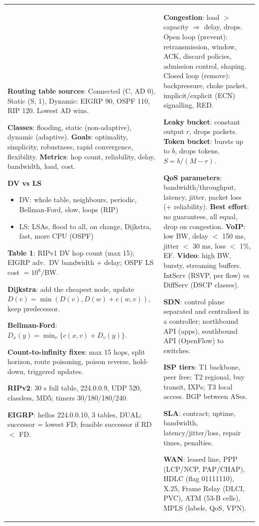 \documentclass[10pt]{article}
\begin{document}
\newpage
\begin{cheatsheet}
\small
\begin{tabularx}{\linewidth}{@{}XX@{}}
\textbf{Routing table sources}: Connected (C, AD 0), Static (S, 1), Dynamic: EIGRP 90, OSPF 110, RIP 120. Lowest AD wins.

\textbf{Classes}: flooding, static (non-adaptive), dynamic (adaptive).
\textbf{Goals}: optimality, simplicity, robustness, rapid convergence, flexibility.
\textbf{Metrics}: hop count, reliability, delay, bandwidth, load, cost.

\textbf{DV vs LS}
\begin{itemize}
\item DV: whole table, neighbours, periodic, Bellman-Ford, slow, loops (RIP)
\item LS: LSAs, flood to all, on change, Dijkstra, fast, more CPU (OSPF)
\end{itemize}
\textbf{Table 1}: RIPv1 DV hop count (max 15); EIGRP adv.\ DV bandwidth + delay; OSPF LS cost $=10^8/$BW.

\textbf{Dijkstra}: add the cheapest node, update $D(v)=\min(D(v), D(w)+c(w,v))$, keep predecessor.

\textbf{Bellman-Ford}: $D_x(y)=\min_v\{c(x,v)+D_v(y)\}$.

\textbf{Count-to-infinity fixes}: max 15 hops, split horizon, route poisoning, poison reverse, hold-down, triggered updates.

\textbf{RIPv2}: 30 s full table, 224.0.0.9, UDP 520, classless, MD5; timers 30/180/180/240.

\textbf{EIGRP}: hellos 224.0.0.10, 3 tables, DUAL; successor = lowest FD; feasible successor if RD $<$ FD.
&
\textbf{Congestion}: load $>$ capacity $\Rightarrow$ delay, drops.
Open loop (prevent): retransmission, window, ACK, discard policies, admission control, shaping.
Closed loop (remove): backpressure, choke packet, implicit/explicit (ECN) signalling, RED.

\textbf{Leaky bucket}: constant output $r$, drops packets. \textbf{Token bucket}: bursts up to $b$, drops tokens, $S = b/(M-r)$.

\textbf{QoS parameters}: bandwidth/throughput, latency, jitter, packet loss (+ reliability).
\textbf{Best effort}: no guarantees, all equal, drop on congestion.
\textbf{VoIP}: low BW, delay $<$ 150 ms, jitter $<$ 30 ms, loss $<$ 1\%, EF. \textbf{Video}: high BW, bursty, streaming buffers.
IntServ (RSVP, per flow) vs DiffServ (DSCP classes).

\textbf{SDN}: control plane separated and centralised in a controller; northbound API (apps), southbound API (OpenFlow) to switches.

\textbf{ISP tiers}: T1 backbone, peer free; T2 regional, buy transit, IXPs; T3 local access. BGP between ASes.

\textbf{SLA}: contract; uptime, bandwidth, latency/jitter/loss, repair times, penalties.

\textbf{WAN}: leased line, PPP (LCP/NCP, PAP/CHAP), HDLC (flag 01111110), X.25, Frame Relay (DLCI, PVC), ATM (53-B cells), MPLS (labels, QoS, VPN).
\end{tabularx}
\end{cheatsheet}
\end{document}

